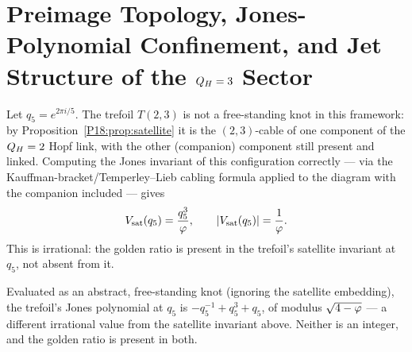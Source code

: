 

\section*{Preimage Topology, Jones-Polynomial Confinement, and Jet Structure of the $Q_H=3$ Sector}
\label{sec:confinement_topology}


\begin{theorem}
\label{P18:thm:trefoil_satellite_jones}
Let $q_5=e^{2\pi i/5}$. The trefoil $T(2,3)$ is not a free-standing
knot in this framework: by Proposition~\ref{P18:prop:satellite} it is
the $(2,3)$-cable of one component of the $Q_H=2$ Hopf link, with the
other (companion) component still present and linked. Computing the
Jones invariant of this configuration correctly --- via the
Kauffman-bracket/Temperley--Lieb cabling formula applied to the
diagram with the companion included --- gives
\begin{equation}
  V_{\mathrm{sat}}(q_5) = \frac{q_5^3}{\varphi}, \qquad
  |V_{\mathrm{sat}}(q_5)| = \frac{1}{\varphi}.
\end{equation}
This is irrational: the golden ratio is present in the trefoil's
satellite invariant at $q_5$, not absent from it.
\end{theorem}

\begin{remark}
\label{P18:rem:trefoil_satellite_correction}
Evaluated as an abstract, free-standing knot (ignoring the satellite
embedding), the trefoil's Jones polynomial at $q_5$ is
$-q_5^{-1}+q_5^3+q_5$, of modulus $\sqrt{4-\varphi}$ --- a different
irrational value from the satellite invariant above. Neither is an
integer, and the golden ratio is present in both.
\end{remark}

